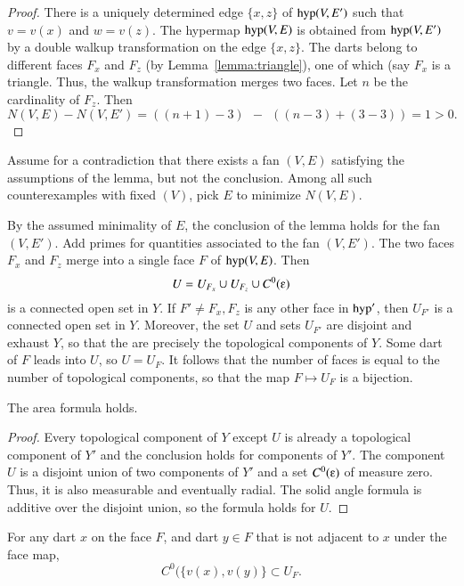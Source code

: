 \begin{proof}  There is a uniquely determined edge $\{x,z\}$ of ${\operatorname{hyp}}(V,E')$ such that $v=v(x)$ and $w=v(z)$.   The hypermap ${\operatorname{hyp}}(V,E)$ is obtained from ${\operatorname{hyp}}(V,E')$ by a double walkup transformation on the edge $\{x,z\}$.  The darts belong to different faces $F_x$ and $F_z$ (by Lemma~\ref{lemma:triangle}), one of which (say $F_x$ is a triangle.  Thus, the walkup transformation merges two faces.  Let $n$ be the cardinality of $F_z$. Then 
$$N(V,E) - N(V,E') = ((n+1)-3) ~~-~~ ((n-3) + (3-3)) = 1 >0.$$
\end{proof}

Assume for a contradiction that there exists a fan $(V,E)$ 
satisfying the assumptions of the lemma, but not the conclusion.
Among all such counterexamples with fixed $(V)$,  pick
$E$ to minimize  $N(V,E)$.

By the assumed minimality of $E$, the conclusion of the lemma holds for the
fan $(V,E')$.  Add primes
for quantities associated to the fan $(V,E')$.  The two faces
$F_x$ and $F_z$ merge into a single face $F$ of ${\operatorname{hyp}}(V,E)$.
Then 
\begin{equation}\label{eqn:U}
U= U_{F_x}\cup U_{F_z}\cup C^0(\e)
\end{equation} 
is a connected open set in $Y$.
If $F'\ne F_x,F_z$ is any other face in ${\operatorname{hyp}}'$, then $U_{F'}$ is
a connected open set in $Y$.  Moreover, the set $U$ and sets $U_{F'}$
are disjoint and exhaust $Y$, so that the are precisely the topological
components of $Y$.  Some dart of $F$ leads into $U$, so $U=U_F$.  It follows
that the number of faces is equal to the number of topological components, so that the map $F\mapsto U_F$ is a bijection.

\begin{lemma} The area formula holds.
\end{lemma}

\begin{proof} Every topological component of $Y$ 
except $U$ is already a topological component of $Y'$ and the conclusion
holds for components of $Y'$.  The component $U$ is a disjoint union of two
components of $Y'$ and a set $C^0(\e)$ of measure zero.  Thus, it
is also measurable and eventually radial.  The solid angle formula is
additive over the disjoint union, so the formula holds for $U$.
\end{proof}

\begin{lemma}  For any dart $x$ on the face $F$, and dart $y\in F$ that is not adjacent to $x$ under the face map, 
$$
C^0(\{v(x),v(y)\} \subset U_F.
$$
\end{lemma}

